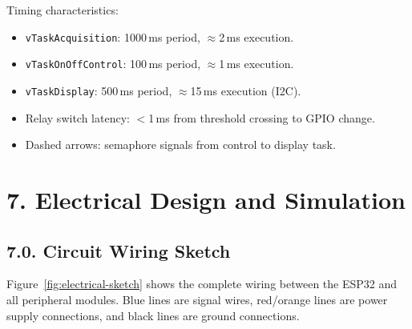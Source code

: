 \documentclass[12pt]{article}
\begin{document}
Timing characteristics:
\begin{itemize}
    \item \texttt{vTaskAcquisition}: 1000\,ms period, $\approx$2\,ms execution.
    \item \texttt{vTaskOnOffControl}: 100\,ms period, $\approx$1\,ms execution.
    \item \texttt{vTaskDisplay}: 500\,ms period, $\approx$15\,ms execution (I2C).
    \item Relay switch latency: $<$1\,ms from threshold crossing to GPIO change.
    \item Dashed arrows: semaphore signals from control to display task.
\end{itemize}

\section*{7. Electrical Design and Simulation}

\subsection*{7.0. Circuit Wiring Sketch}

Figure~\ref{fig:electrical-sketch} shows the complete wiring between the ESP32 and
all peripheral modules.  Blue lines are signal wires, red/orange lines are power
supply connections, and black lines are ground connections.

\end{document}
